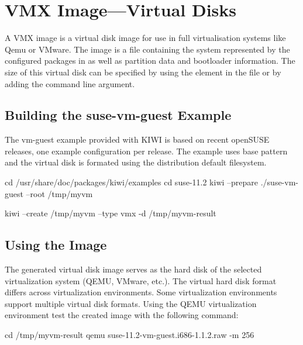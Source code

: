 \chapter{VMX Image---Virtual Disks}
\label{chapter:vmx}
\minitoc

A VMX image is a virtual disk image for use in full virtualisation
systems like Qemu or VMware. The image is a file containing the
system represented by the configured packages in %
 as well
as partition data and bootloader information. The size of
this virtual disk can be specified by using the  element
in the  file or by adding the  command
line argument.

\section{Building the suse-vm-guest Example}
The vm-guest example provided with KIWI is based on recent openSUSE releases,
one example configuration per release. The example uses base pattern and the
virtual disk is formated using the distribution default filesystem.

\begin{Command}{12cm}
cd /usr/share/doc/packages/kiwi/examples
cd suse-11.2
kiwi --prepare ./suse-vm-guest --root /tmp/myvm
\end{Command}

\begin{Command}{12cm}
kiwi --create /tmp/myvm --type vmx -d /tmp/myvm-result
\end{Command}

\section{Using the Image}

The generated virtual disk image serves as the hard disk of the selected
virtualization system (QEMU, VMware, etc.). The virtual hard disk format 
differs across virtualization environments. Some virtualization environments
support multiple virtual disk formats. Using the QEMU virtualization 
environment test the created image with the following command:

\begin{Command}{12cm}
cd /tmp/myvm-result
qemu suse-11.2-vm-guest.i686-1.1.2.raw -m 256
\end{Command}

